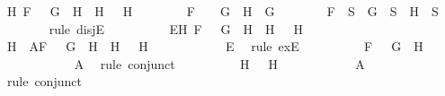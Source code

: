 \begin{isabellebody}
\ {\isachardoublequoteopen}{\isacharparenleft}{\isasymexists}H{}{\isachardot}\ F\ {\isacharequal}\ \isactrlbold {\isasymnot}\ {\isacharparenleft}G\ \isactrlbold {\isasymrightarrow}\ H{}{\isacharparenright}\ {\isasymand}\ H\ {\isacharequal}\ \isactrlbold {\isasymnot}\ H{}{\isacharparenright}\ {\isasymor}\ \isanewline
\ \ \ \ \ \ F\ {\isacharequal}\ \isactrlbold {\isasymnot}\ {\isacharparenleft}\isactrlbold {\isasymnot}\ G{\isacharparenright}\ {\isasymand}\ H\ {\isacharequal}\ G{\isachardoublequoteclose}\isanewline
\ \ \ \ \ \ \isamarkupfalse%
\ {\isachardoublequoteopen}F\ {\isasymin}\ S\ {\isasymlongrightarrow}\ G\ {\isasymin}\ S\ {\isasymand}\ H\ {\isasymin}\ S{\isachardoublequoteclose}\ \isanewline
\ \ \ \ \ \ \isamarkupfalse%
\ {\isacharparenleft}rule\ disjE{\isacharparenright}\isanewline
\ \ \ \ \ \ \ \ \isamarkupfalse%
\ E{}{\isacharcolon}{\isachardoublequoteopen}{\isasymexists}H{}{\isachardot}\ F\ {\isacharequal}\ \isactrlbold {\isasymnot}\ {\isacharparenleft}G\ \isactrlbold {\isasymrightarrow}\ H{}{\isacharparenright}\ {\isasymand}\ H\ {\isacharequal}\ \isactrlbold {\isasymnot}\ H{}{\isachardoublequoteclose}\isanewline
\ \ \ \ \ \ \ \ \isamarkupfalse%
\ H{}\ \ A{}{\isacharcolon}{\isachardoublequoteopen}F\ {\isacharequal}\ \isactrlbold {\isasymnot}\ {\isacharparenleft}G\ \isactrlbold {\isasymrightarrow}\ H{}{\isacharparenright}\ {\isasymand}\ H\ {\isacharequal}\ \isactrlbold {\isasymnot}\ H{}{\isachardoublequoteclose}\isanewline
\ \ \ \ \ \ \ \ \ \ \isamarkupfalse%
\ E{}\ \isamarkupfalse%
\ {\isacharparenleft}rule\ exE{\isacharparenright}\isanewline
\ \ \ \ \ \ \ \ \isamarkupfalse%
\ {\isachardoublequoteopen}F\ {\isacharequal}\ \isactrlbold {\isasymnot}\ {\isacharparenleft}G\ \isactrlbold {\isasymrightarrow}\ H{}{\isacharparenright}{\isachardoublequoteclose}\isanewline
\ \ \ \ \ \ \ \ \ \ \isamarkupfalse%
\ A{}\ \isamarkupfalse%
\ {\isacharparenleft}rule\ conjunct{}{\isacharparenright}\isanewline
\ \ \ \ \ \ \ \ \isamarkupfalse%
\ {\isachardoublequoteopen}H\ {\isacharequal}\ \isactrlbold {\isasymnot}\ H{}{\isachardoublequoteclose}\isanewline
\ \ \ \ \ \ \ \ \ \ \isamarkupfalse%
\ A{}\ \isamarkupfalse%
\ {\isacharparenleft}rule\ conjunct{}{\isacharparenright}\isanewline

\end{isabellebody}
